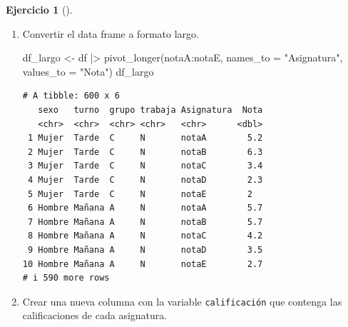 \documentclass[
  a4paper,
]{scrreport}
\newenvironment{Shaded}{\begin{snugshade}}{\end{snugshade}}
\newcommand{\AttributeTok}[1]{\textcolor[rgb]{0.40,0.45,0.13}{#1}}
\newcommand{\FunctionTok}[1]{\textcolor[rgb]{0.28,0.35,0.67}{#1}}
\newcommand{\NormalTok}[1]{\textcolor[rgb]{0.00,0.23,0.31}{#1}}
\newcommand{\OtherTok}[1]{\textcolor[rgb]{0.00,0.23,0.31}{#1}}
\newcommand{\SpecialCharTok}[1]{\textcolor[rgb]{0.37,0.37,0.37}{#1}}
\newcommand{\StringTok}[1]{\textcolor[rgb]{0.13,0.47,0.30}{#1}}
\theoremstyle{definition}
\newtheorem{exercise}{Ejercicio}[chapter]
\theoremstyle{remark}
\begin{document}
\begin{exercise}[]
\begin{enumerate}
\begin{tcolorbox}
  \end{tcolorbox}
\item
  Convertir el data frame a formato largo.

  \begin{tcolorbox}[enhanced jigsaw, coltitle=black, left=2mm, colback=white, leftrule=.75mm, toptitle=1mm, breakable, bottomrule=.15mm, titlerule=0mm, bottomtitle=1mm, title=\textcolor{quarto-callout-tip-color}{\faLightbulb}\hspace{0.5em}{Solución}, arc=.35mm, toprule=.15mm, rightrule=.15mm, colframe=quarto-callout-tip-color-frame, opacityback=0, colbacktitle=quarto-callout-tip-color!10!white, opacitybacktitle=0.6]

\begin{Shaded}
\begin{Highlighting}[]
\NormalTok{df\_largo }\OtherTok{\textless{}{-}}\NormalTok{ df }\SpecialCharTok{|\textgreater{}} \FunctionTok{pivot\_longer}\NormalTok{(notaA}\SpecialCharTok{:}\NormalTok{notaE, }\AttributeTok{names\_to =} \StringTok{"Asignatura"}\NormalTok{, }\AttributeTok{values\_to =} \StringTok{"Nota"}\NormalTok{)}
\NormalTok{df\_largo}
\end{Highlighting}
\end{Shaded}

\begin{verbatim}
# A tibble: 600 x 6
   sexo   turno  grupo trabaja Asignatura  Nota
   <chr>  <chr>  <chr> <chr>   <chr>      <dbl>
 1 Mujer  Tarde  C     N       notaA        5.2
 2 Mujer  Tarde  C     N       notaB        6.3
 3 Mujer  Tarde  C     N       notaC        3.4
 4 Mujer  Tarde  C     N       notaD        2.3
 5 Mujer  Tarde  C     N       notaE        2  
 6 Hombre Mañana A     N       notaA        5.7
 7 Hombre Mañana A     N       notaB        5.7
 8 Hombre Mañana A     N       notaC        4.2
 9 Hombre Mañana A     N       notaD        3.5
10 Hombre Mañana A     N       notaE        2.7
# i 590 more rows
\end{verbatim}

  \end{tcolorbox}
\item
  Crear una nueva columna con la variable \texttt{calificación} que
  contenga las calificaciones de cada asignatura.

  \begin{tcolorbox}[enhanced jigsaw, coltitle=black, left=2mm, colback=white, leftrule=.75mm, toptitle=1mm, breakable, bottomrule=.15mm, titlerule=0mm, bottomtitle=1mm, title=\textcolor{quarto-callout-tip-color}{\faLightbulb}\hspace{0.5em}{Solución}, arc=.35mm, toprule=.15mm, rightrule=.15mm, colframe=quarto-callout-tip-color-frame, opacityback=0, colbacktitle=quarto-callout-tip-color!10!white, opacitybacktitle=0.6]


\end{tcolorbox}
\end{enumerate}
\end{exercise}
\end{document}
